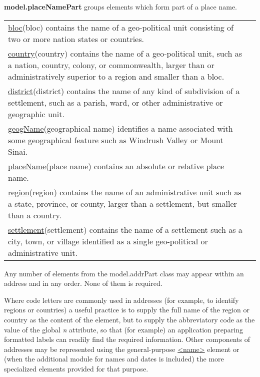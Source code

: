 \begin{sansreflist}
\item [\textbf{model.placeNamePart}] groups elements which form part of a place name. \par 
\begin{longtable}{P{0.1712285456187895\textwidth}P{0.6787714543812104\textwidth}}
\hyperref[TEI.bloc]{bloc}\tabcellsep (bloc) contains the name of a geo-political unit consisting of two or more nation states or countries.\\
\hyperref[TEI.country]{country}\tabcellsep (country) contains the name of a geo-political unit, such as a nation, country, colony, or commonwealth, larger than or administratively superior to a region and smaller than a bloc.\\
\hyperref[TEI.district]{district}\tabcellsep (district) contains the name of any kind of subdivision of a settlement, such as a parish, ward, or other administrative or geographic unit.\\
\hyperref[TEI.geogName]{geogName}\tabcellsep (geographical name) identifies a name associated with some geographical feature such as Windrush Valley or Mount Sinai.\\
\hyperref[TEI.placeName]{placeName}\tabcellsep (place name) contains an absolute or relative place name.\\
\hyperref[TEI.region]{region}\tabcellsep (region) contains the name of an administrative unit such as a state, province, or county, larger than a settlement, but smaller than a country.\\
\hyperref[TEI.settlement]{settlement}\tabcellsep (settlement) contains the name of a settlement such as a city, town, or village identified as a single geo-political or administrative unit.\end{longtable} \par
 
\end{sansreflist}
 Any number of elements from the \textsf{model.addrPart} class may appear within an address and in any order. None of them is required.\par
Where code letters are commonly used in addresses (for example, to identify regions or countries) a useful practice is to supply the full name of the region or country as the content of the element, but to supply the abbreviatory code as the value of the global {\itshape n} attribute, so that (for example) an application preparing formatted labels can readily find the required information. Other components of addresses may be represented using the general-purpose \hyperref[TEI.name]{<name>} element or (when the additional module for names and dates is included) the more specialized elements provided for that purpose.\par
